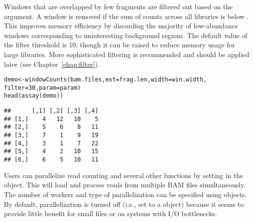 \documentclass{report}\usepackage[]{graphicx}\usepackage[usenames,dvipsnames]{color}
\newcommand{\hlnum}[1]{\textcolor[rgb]{0.816,0.125,0.439}{#1}}%
\newcommand{\hlopt}[1]{\textcolor[rgb]{0,0,0}{#1}}%
\newcommand{\hlstd}[1]{\textcolor[rgb]{0.251,0.251,0.251}{#1}}%
\newcommand{\hlkwb}[1]{\textcolor[rgb]{0,0,0}{#1}}%
\newcommand{\hlkwc}[1]{\textcolor[rgb]{0.251,0.251,0.251}{#1}}%
\newcommand{\hlkwd}[1]{\textcolor[rgb]{0.878,0.439,0.125}{#1}}%
\newenvironment{knitrout}{}{} %
\begin{document}
Windows that are overlapped by few fragments are filtered out based on the  argument. 
A window is removed if the sum of counts across all libraries is below .
This improves memory efficiency by discarding the majority of low-abundance windows corresponding to uninteresting background regions. 
The default value of the filter threshold is 10, though it can be raised to reduce memory usage for large libraries.
More sophisticated filtering is recommended and should be applied later (see Chapter~\ref{chap:filter}).

\begin{knitrout}
\color{fgcolor}\begin{kframe}
\begin{alltt}
\hlstd{demo} \hlkwb{<-} \hlkwd{windowCounts}\hlstd{(bam.files,} \hlkwc{ext}\hlstd{=frag.len,} \hlkwc{width}\hlstd{=win.width,}
                     \hlkwc{filter}\hlstd{=}\hlnum{30}\hlstd{,} \hlkwc{param}\hlstd{=param)}
\hlkwd{head}\hlstd{(}\hlkwd{assay}\hlstd{(demo))}
\end{alltt}
\begin{verbatim}
##      [,1] [,2] [,3] [,4]
## [1,]    4   12   10    5
## [2,]    5    6    8   11
## [3,]    7    1    9   19
## [4,]    3    1    7   22
## [5,]    4    2   10   15
## [6,]    6    5   10   11
\end{verbatim}
\end{kframe}
\end{knitrout}

Users can parallelize read counting and several other functions by setting  in the  object.
This will load and process reads from multiple BAM files simultaneously.
The number of workers and type of parallelization can be specified using  objects.
By default, parallelization is turned off (i.e., set to a  object) because it seems to provide little benefit for small files or on systems with I/O bottlenecks.

\begin{knitrout}
\color{fgcolor}
\end{knitrout}
\end{document}
